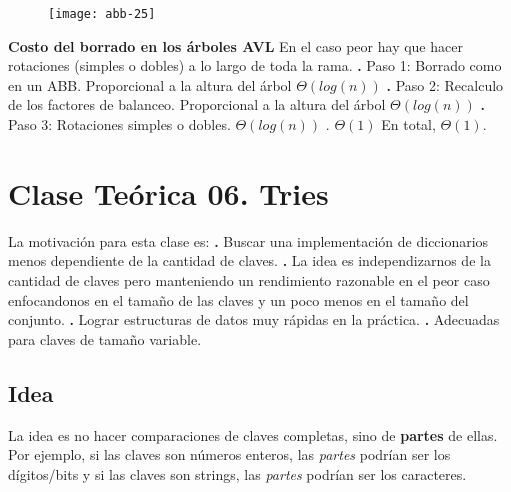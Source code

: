 \documentclass[10pt,a4paper]{article}
\begin{document}
\begin{figure}[h]
	\centering
\texttt{[image: abb-25]}
	\label{drivers1}
\end{figure} 

\textbf{Costo del borrado en los árboles AVL}
\newline
\newline
En el caso peor hay que hacer rotaciones (simples o dobles) a lo largo de toda la rama.
\newline
\newline
\textbf{.} Paso 1: Borrado como en un ABB. Proporcional a la altura del árbol $\Theta(log(n))$
\newline
\newline
\textbf{.} Paso 2: Recalculo de los factores de balanceo. Proporcional a la altura del árbol $\Theta(log(n))$
\newline
\newline
\textbf{.} Paso 3: Rotaciones simples o dobles. $\Theta(log(n))$ . $\Theta(1)$
\newline
\newline
En total, $\Theta(1)$. 

\section{Clase Teórica 06. Tries}

La motivación para esta clase es:
\newline
\newline
\textbf{.} Buscar una implementación de diccionarios menos dependiente de la cantidad de claves.
\newline
\newline
\textbf{.} La idea es independizarnos de la cantidad de claves pero manteniendo un rendimiento razonable en el peor caso enfocandonos en el tamaño de las claves y un poco menos en el tamaño del conjunto.
\newline
\newline
\textbf{.} Lograr estructuras de datos muy rápidas en la práctica.
\newline
\newline
\textbf{.} Adecuadas para claves de tamaño variable.

\subsection{Idea}

La idea es no hacer comparaciones de claves completas, sino de \textbf{partes} de ellas. Por ejemplo, si las claves son números enteros, las \textit{partes} podrían ser los dígitos/bits y si las claves son strings, las \textit{partes} podrían ser los caracteres.
\end{document}
